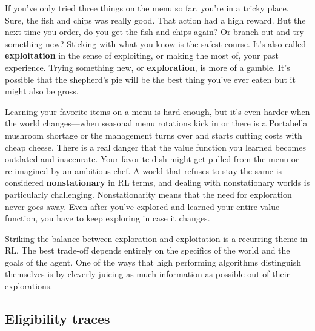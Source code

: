If you’ve only tried three things on the menu so far, you're in a
tricky place. Sure, the fish and chips was really good. That action had a
high reward. But the next time you order, do you get the fish and chips again?
Or branch out and try something new? Sticking with what you know is
the safest course. It's also called \textbf{exploitation} in the sense of
exploiting, or making the most of, your past experience. Trying something new,
or \textbf{exploration}, is more of a gamble. It's possible that the
shepherd's pie will be the best thing you've ever eaten but it might
also be gross.

Learning your favorite items on a menu is hard enough, but it's even
harder when the world changes---when seasonal menu rotations kick in or
there is a Portabella mushroom shortage or the management turns over and starts
cutting costs with cheap cheese. There is a real danger that the value function you
learned becomes outdated and inaccurate. Your favorite dish might get
pulled from the menu or re-imagined by an ambitious chef. A world that
refuses to stay the same is considered \textbf{nonstationary} in RL terms,
and dealing with nonstationary worlds is particularly challenging.
Nonstationarity means that the need for exploration never goes away.
Even after you've explored and learned your entire value function,
you have to keep exploring in case it changes.

Striking the balance between exploration and exploitation is a recurring
theme in RL. The best trade-off depends entirely on the specifics of the
world and the goals of the agent. One of the ways that high performing
algorithms distinguish themselves is by cleverly juicing as much information
as possible out of their explorations. 


\subsection{Eligibility traces}
\label{subsec:introeligibility}

